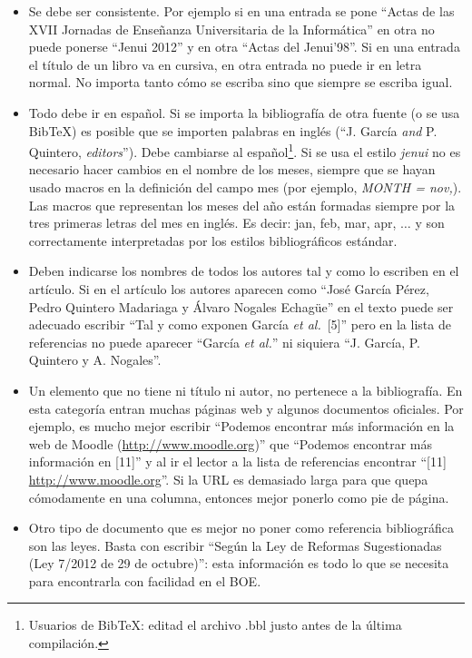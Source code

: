 \documentclass[twocolumn,twoside,a4paper, 10pt]{article}
\begin{document}
\begin{itemize}
	\item Se debe ser consistente.  Por ejemplo si en una entrada se
	pone ``Actas de las XVII Jornadas de Enseñanza Universitaria de la
	Informática'' en otra no puede ponerse ``Jenui 2012'' y en otra
	``Actas del Jenui'98''.  Si en una entrada el título de un libro
	va en cursiva, en otra entrada no puede ir en letra normal.  No
	importa tanto cómo se escriba sino que siempre se escriba igual.
	
	\item Todo debe ir en español.  Si se importa la bibliografía de
	otra fuente (o se usa BibTeX) es posible que se importen palabras
	en inglés (``J. García \emph{and} P. Quintero, \emph{editors}'').
	Debe cambiarse al español\footnote{Usuarios de BibTeX: editad el
	archivo .bbl justo antes de la última compilación.}. Si se usa el estilo
	\textit{jenui} no es necesario hacer cambios en el nombre de los meses, 
	siempre que se hayan usado macros en la definición del campo mes (por ejemplo, 
	\textit{MONTH = nov,}). Las macros que representan
	los meses del año están formadas siempre por la tres primeras letras del mes en inglés.
	Es decir: jan, feb, mar, apr, $\ldots$ y son correctamente interpretadas por  
	los estilos bibliográficos estándar.
	
	\item Deben indicarse los nombres de todos los autores tal y 
	como lo escriben en el artículo. Si en el artículo los autores 
	aparecen como ``José García Pérez, Pedro Quintero Madariaga y 
	\'Alvaro Nogales Echagüe'' en el texto puede ser adecuado escribir 
	``Tal y como exponen García \emph{et al.}~[5]'' pero en la lista 
	de referencias no puede aparecer ``García \emph{et al.}'' ni 
	siquiera ``J. García, P. Quintero y A. Nogales''. 
	
	\item Un elemento que no tiene ni título ni autor, no pertenece a 
	la bibliografía. En esta categoría entran muchas páginas web y 
	algunos documentos oficiales. Por ejemplo, es mucho mejor 
	escribir ``Podemos encontrar más información en la web de Moodle 
	(\url{http://www.moodle.org})'' que ``Podemos encontrar más 
	información en [11]'' y al ir el lector a la lista de referencias 
	encontrar ``[11] \url{http://www.moodle.org}''. Si la URL es demasiado 
	larga para que quepa cómodamente en una columna, entonces mejor 
	ponerlo como pie de página. 
	
	\item Otro tipo de documento que es mejor no poner como referencia 
	bibliográfica son las leyes. Basta con escribir ``Según la Ley de 
	Reformas Sugestionadas (Ley 7/2012 de 29 de octubre)'': esta 
	información es todo lo que se necesita para encontrarla con 
	facilidad en el BOE.
\end{itemize}
\end{document}
